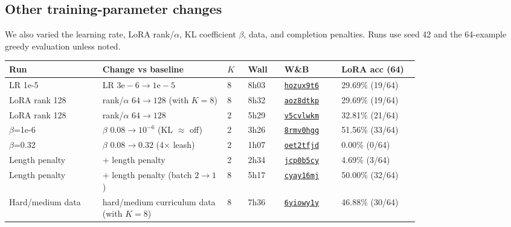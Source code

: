 \subsection{Other training-parameter changes}

We also varied the learning rate, LoRA rank/$\alpha$, KL coefficient $\beta$, data,
and completion penalties. Runs use seed 42 and the 64-example greedy evaluation unless noted.

\begin{table}[htbp]
\centering
\scriptsize
\setlength{\tabcolsep}{4pt}
\begin{tabular}{@{}L{0.18\linewidth}L{0.24\linewidth}L{0.04\linewidth}L{0.07\linewidth}L{0.11\linewidth}L{0.15\linewidth}@{}}
\toprule
Run & Change vs baseline & $K$ & Wall & W\&B & LoRA acc (64) \\
\midrule
LR 1e-5        & LR $3\mathrm{e}{-}6\to1\mathrm{e}{-}5$       & 8 & 8h03 & \href{https://wandb.ai/felsomoye-university-of-cambridge/tunix/runs/hozux9t6}{\texttt{hozux9t6}} & 29.69\% (19/64) \\
LoRA rank 128  & rank/$\alpha$ $64\to128$ (with $K{=}8$)      & 8 & 8h32 & \href{https://wandb.ai/felsomoye-university-of-cambridge/tunix/runs/aoz8dtkp}{\texttt{aoz8dtkp}} & 29.69\% (19/64) \\
LoRA rank 128  & rank/$\alpha$ $64\to128$                     & 2 & 5h29 & \href{https://wandb.ai/felsomoye-university-of-cambridge/tunix/runs/v5cvlwkm}{\texttt{v5cvlwkm}} & 32.81\% (21/64) \\
$\beta$=1e-6   & $\beta$ $0.08\to10^{-6}$ (KL $\approx$ off)   & 2 & 3h26 & \href{https://wandb.ai/felsomoye-university-of-cambridge/tunix/runs/8rmv0hgg}{\texttt{8rmv0hgg}} & 51.56\% (33/64) \\
$\beta$=0.32   & $\beta$ $0.08\to0.32$ (4$\times$ leash)       & 2 & 1h07 & \href{https://wandb.ai/felsomoye-university-of-cambridge/tunix/runs/oet2tfjd}{\texttt{oet2tfjd}} & 0.00\% (0/64) \\
Length penalty & $+$ length penalty                           & 2 & 2h34 & \href{https://wandb.ai/felsomoye-university-of-cambridge/tunix/runs/jcp0b5cy}{\texttt{jcp0b5cy}} & 4.69\% (3/64) \\
Length penalty & $+$ length penalty (batch $2\to1$)           & 8 & 5h17 & \href{https://wandb.ai/felsomoye-university-of-cambridge/tunix/runs/cyay16mj}{\texttt{cyay16mj}} & 50.00\% (32/64) \\
Hard/medium data & hard/medium curriculum data (with $K{=}8$) & 8 & 7h36 & \href{https://wandb.ai/felsomoye-university-of-cambridge/tunix/runs/6yiowy1y}{\texttt{6yiowy1y}} & 46.88\% (30/64) \\

\end{tabular}
\end{table}
